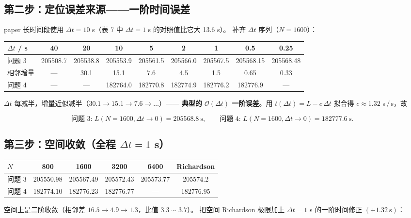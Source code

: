 \documentclass[11pt,a4paper]{article}
\theoremstyle{definition}
\begin{document}
\subsection{第二步：定位误差来源——一阶时间误差}

paper 长时间段使用 $\Delta t=10$ s（表 7 中 $\Delta t=1$ s 的对照值比它大 13.6 s）。
补齐 $\Delta t$ 序列（$N=1600$）：

\begin{center}
\small
\begin{tabular}{@{}lcccccccc@{}}
\toprule
$\Delta t$ / s & 40 & 20 & 10 & 5 & 2 & 1 & 0.5 & 0.25 \\
\midrule
问题 3 & 205508.7 & 205538.8 & 205553.9 & 205561.5 & 205566.0 & 205567.5 & 205568.15 & 205568.48 \\
相邻增量 & --- & 30.1 & 15.1 & 7.6 & 4.5 & 1.5 & 0.65 & 0.33 \\
\midrule
问题 4 & --- & --- & 182764.0 & 182770.8 & 182774.9 & 182776.2 & 182776.9 & --- \\
\bottomrule
\end{tabular}
\end{center}

$\Delta t$ 每减半，增量近似减半（$30.1\to15.1\to7.6\to\dots$）——
\textbf{典型的 $\mathcal{O}(\Delta t)$ 一阶误差}。用 $t(\Delta t)=L-c\,\Delta t$ 拟合得
$c\approx1.32$ s$\,/\,$s，故

\[
\text{问题 3: } L(N=1600,\Delta t\to0)=205568.8\ \mathrm{s},\qquad
\text{问题 4: } L(N=1600,\Delta t\to0)=182777.6\ \mathrm{s}.
\]

\subsection{第三步：空间收敛（全程 $\Delta t=1$ s）}

\begin{center}
\small
\begin{tabular}{@{}lccccc@{}}
\toprule
$N$ & 800 & 1600 & 3200 & 6400 & Richardson \\
\midrule
问题 3 & 205550.98 & 205567.49 & 205572.43 & 205573.77 & 205574.2 \\
问题 4 & 182774.10 & 182776.23 & 182776.77 & --- & 182776.95 \\
\bottomrule
\end{tabular}
\end{center}

空间上是二阶收敛（相邻差 $16.5\to4.9\to1.3$，比值 $3.3\sim3.7$）。
把空间 Richardson 极限加上 $\Delta t=1$ s 的一阶时间修正 $(+1.32\ \mathrm{s})$：
\end{document}
